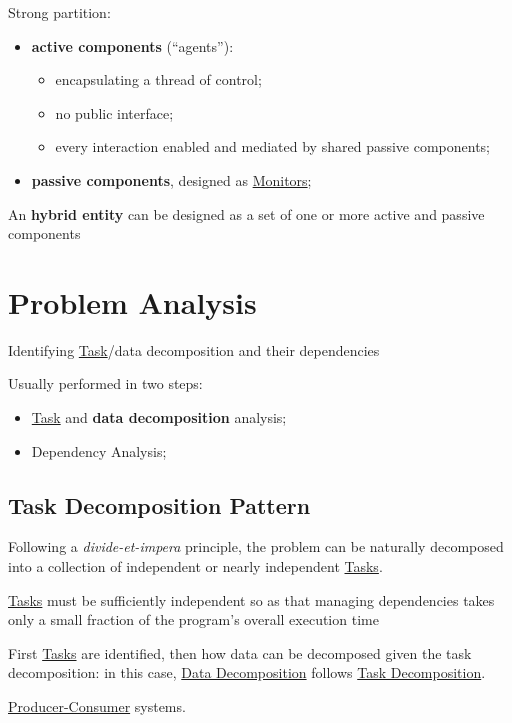 \begin{note}
    Strong partition:
    \begin{itemize}
        \item \textbf{active components} (``agents''):
            \begin{itemize}
                \item encapsulating a thread of control;
                \item no public interface;
                \item every interaction enabled and mediated by shared passive components;
            \end{itemize}
        \item \textbf{passive components}, designed as \hyperref[def:monitor]{Monitors};
    \end{itemize}
    \begin{warning}
        An \textbf{hybrid entity} can be designed as a set of one or more active and passive components
    \end{warning}
\end{note}
%
\section{Problem Analysis}\label{sec:ed_problem_analysis} %
\begin{note}[Objective]
    Identifying \hyperref[def:task]{Task}/data decomposition and their dependencies
\end{note}
Usually performed in two steps:
\begin{itemize}
    \item \hyperref[def:task]{Task} and \textbf{data decomposition} analysis;
    \item Dependency Analysis;
\end{itemize}
%
\subsection{Task Decomposition Pattern}\label{sub:ed_task_decomposition_pattern} %
Following a \textit{divide-et-impera} principle, the problem can be naturally decomposed into a collection of independent or nearly independent \hyperref[def:task]{Tasks}.
\begin{note}
    \hyperref[def:task]{Tasks} must be sufficiently independent so as that managing dependencies takes only a small fraction of the program's overall execution time
\end{note}
First \hyperref[def:task]{Tasks} are identified, then how data can be decomposed given the task decomposition: in this case, \hyperref[sub:ed_data_decomposition_pattern]{Data Decomposition} follows \hyperref[sub:ed_task_decomposition_pattern]{Task Decomposition}.
\begin{example}{}{}
    \hyperref[sub:cp_producer_consumer_p_c_problem]{Producer-Consumer} systems.
\end{example}
%
